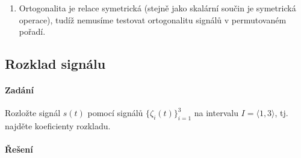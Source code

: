\documentclass[11pt, a4paper]{article}
\begin{document}
\begin{enumerate}
					\item Ortogonalita je relace symetrická (stejně jako skalární součin je symetrická operace), tudíž nemusíme testovat ortogonalitu signálů v permutovaném pořadí.
				\end{enumerate}
			
		\subsection{Rozklad signálu}
			
			\paragraph{Zadání}
			
				Rozložte signál $s(t)$ pomocí signálů $\{ \zeta_i(t) \}_{i=1}^3$ na intervalu $I = \langle 1,3 \rangle$, tj. najděte koeficienty rozkladu.
				
			\paragraph{Řešení}
				
\end{document}
